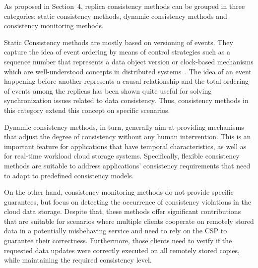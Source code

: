 As proposed in Section~4, replica consistency methods can be grouped in three categories: static consistency methods, dynamic consistency methods and consistency monitoring methods.

Static Consistency methods are mostly based on versioning of events. They capture the idea of event ordering by means of control strategies such as a sequence number that represents a data object version or clock-based mechanisms which are well-under\-stood concepts in distributed systems~\cite{fidge1991logical, lamport1978time, mattern1989virtual}. The idea of an event happening before another represents a causal relationship and the total ordering of events among the replicas has been shown quite useful for solving synchronization issues related to data consistency. Thus, consistency methods in this category extend this concept on specific scenarios.

Dynamic consistency methods, in turn, generally aim at providing mechanisms that adjust the degree of consistency without any human intervention. This is an important feature for applications that have temporal characteristics, 
as well as for real-time workload cloud storage systems. Specifically, flexible consistency methods are suitable to address applications’ consistency requirements that need to adapt to predefined consistency models.

On the other hand, consistency monitoring methods do not provide specific guarantees, but focus on detecting the occurrence of consistency violations in the cloud data storage.  Despite that, these methods offer significant contributions that are suitable for scenarios where multiple clients cooperate on remotely stored data in a potentially misbehaving service and need to rely on the CSP to guarantee their correctness. Furthermore, those clients need to verify if the requested data updates were correctly executed on all remotely stored copies, while maintaining the required consistency level.

